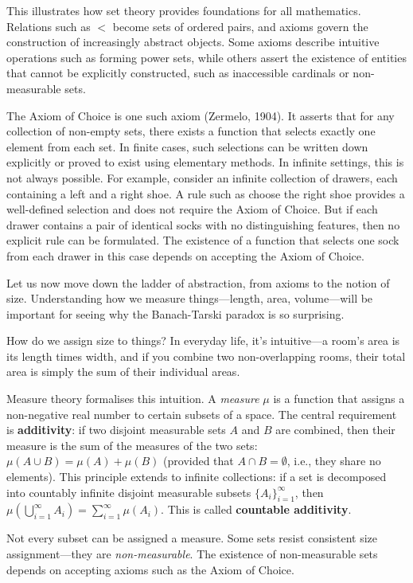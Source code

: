 This illustrates how set theory provides foundations for all mathematics. Relations such as $<$ become sets of ordered pairs, and axioms govern the construction of increasingly abstract objects. Some axioms describe intuitive operations such as forming power sets, while others assert the existence of entities that cannot be explicitly constructed, such as inaccessible cardinals or non-measurable sets.

The Axiom of Choice is one such axiom (Zermelo, 1904). It asserts that for any collection of non-empty sets, there exists a function that selects exactly one element from each set. In finite cases, such selections can be written down explicitly or proved to exist using elementary methods. In infinite settings, this is not always possible. For example, consider an infinite collection of drawers, each containing a left and a right shoe. A rule such as \QSOpen{}choose the right shoe\QSClose{} provides a well-defined selection and does not require the Axiom of Choice. But if each drawer contains a pair of identical socks with no distinguishing features, then no explicit rule can be formulated. The existence of a function that selects one sock from each drawer in this case depends on accepting the Axiom of Choice.

Let us now move down the ladder of abstraction, from axioms to the notion of size. Understanding how we measure things—length, area, volume—will be important for seeing why the Banach-Tarski paradox is so surprising.

How do we assign \QSOpen{}size\QSClose{} to things? In everyday life, it's intuitive—a room's area is its length times width, and if you combine two non-overlapping rooms, their total area is simply the sum of their individual areas. 

Measure theory formalises this intuition. A \emph{measure} $\mu$ is a function that assigns a non-negative real number to certain subsets of a space. The central requirement is \textbf{additivity}: if two disjoint measurable sets $A$ and $B$ are combined, then their measure is the sum of the measures of the two sets: $\mu(A \cup B) = \mu(A) + \mu(B)$ (provided that $A \cap B = \emptyset$, i.e., they share no elements). This principle extends to infinite collections: if a set is decomposed into countably infinite disjoint measurable subsets $\{A_i\}_{i=1}^\infty$, then $\mu\left( \bigcup_{i=1}^\infty A_i \right) = \sum_{i=1}^\infty \mu(A_i)$. This is called \textbf{countable additivity}.

Not every subset can be assigned a measure. Some sets resist consistent size assignment—they are \emph{non-measurable}. The existence of non-measurable sets depends on accepting axioms such as the Axiom of Choice.

